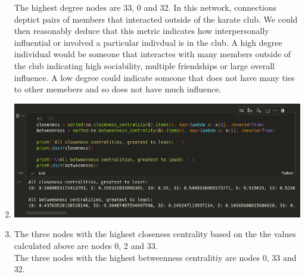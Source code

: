\documentclass{article}
\begin{document}
\begin{enumerate}[label=(\alph*), left=10pt, itemsep=10pt]
\begin{minipage}[t]{0.9\textwidth}
            \vspace{1em}

            The highest degree nodes are 33, 0 and 32. In this network, connections deptict pairs
            of members that interacted outside of the karate club. We could then reasonably deduce that
            this metric indicates how interpersonally influential or involved a particular indivdual
            is in the club. A high degree individual would be someone that interactes with many
            members outside of the club indicating high sociability, multiple friendships or large
            overall influence. A low degree could indicate someone that does not have many ties to
            other memebers and so does not have much influence.

        \end{minipage}

        \item \begin{minipage}[t]{0.9\textwidth}
        
            \begin{minipage}[t]{0.9\textwidth}
                \vspace{0.1em} %
                \centering
                \includegraphics[width=5.9in]{./5f.png}
            \end{minipage}

        \end{minipage}

        \item \begin{minipage}[t]{0.9\textwidth}

            The three nodes with the highest closeness centrality based on the the values
            calculated above are nodes 0, 2 and 33.\\
            The three nodes with the highest betweenness centralitiy are nodes 0, 33 and 32.\\


\end{minipage}
\end{enumerate}
\end{document}
